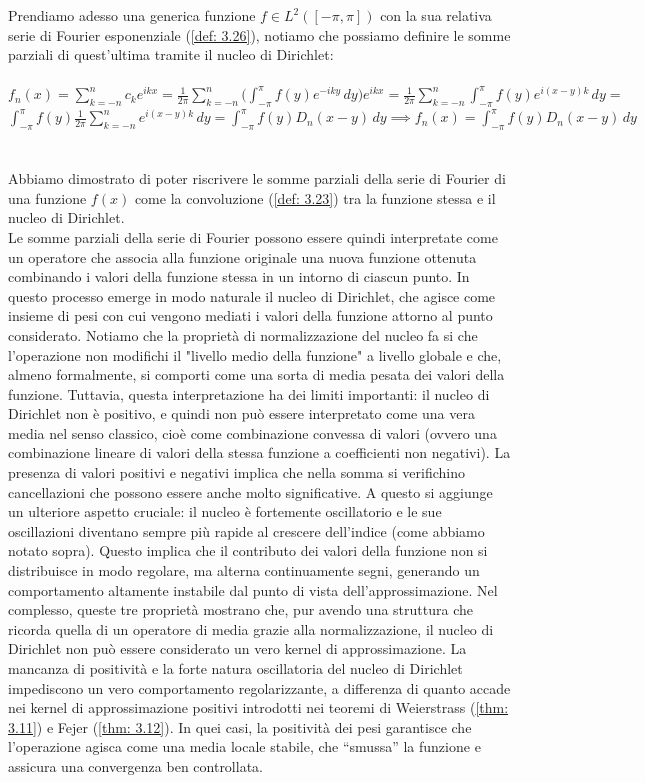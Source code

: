 \documentclass[a4paper,12pt]{report}
\begin{document}
Prendiamo adesso una generica funzione $f\in L^2([-\pi, \pi])$ con la sua relativa serie di Fourier esponenziale (\ref{def: 3.26}), notiamo che possiamo definire le somme parziali di quest'ultima tramite il nucleo di Dirichlet:
\\
\\ $f_n(x)=\displaystyle\sum_{k=-n}^nc_ke^{ikx}=\frac{1}{2\pi}\sum_{k=-n}^n\bigg(\int_{-\pi}^\pi f(y)e^{-iky}\,dy\bigg)e^{ikx}=\frac{1}{2\pi}\sum_{k=-n}^n\int_{-\pi}^\pi f(y)e^{i(x-y)k} \,dy=$
\\$\displaystyle\int_{-\pi}^\pi f(y)\frac{1}{2\pi}\sum_{k=-n}^ne^{i(x-y)k}\,dy=\int_{-\pi}^\pi f(y) D_n(x-y) \,dy \implies f_n(x)=\int_{-\pi}^\pi f(y) D_n(x-y)\,dy$
\\
\\
\\Abbiamo dimostrato di poter riscrivere le somme parziali della serie di Fourier di una funzione $f(x)$ come la convoluzione (\ref{def: 3.23}) tra la funzione stessa e il nucleo di Dirichlet. 
\\ Le somme parziali della serie di Fourier possono essere quindi interpretate come un operatore che associa alla funzione originale una nuova funzione ottenuta combinando i valori della funzione stessa in un intorno di ciascun punto. In questo processo emerge in modo naturale il nucleo di Dirichlet, che agisce come insieme di pesi con cui vengono mediati i valori della funzione attorno al punto considerato. Notiamo che la proprietà di normalizzazione del nucleo fa si che l’operazione non modifichi il "livello medio della funzione" a livello globale e che, almeno formalmente, si comporti come una sorta di media pesata dei valori della funzione. Tuttavia, questa interpretazione ha dei limiti importanti: il nucleo di Dirichlet non è positivo, e quindi non può essere interpretato come una vera media nel senso classico, cioè come combinazione convessa di valori (ovvero una combinazione lineare di valori della stessa funzione a coefficienti non negativi). La presenza di valori positivi e negativi implica che nella somma si verifichino cancellazioni che possono essere anche molto significative.
A questo si aggiunge un ulteriore aspetto cruciale: il nucleo è fortemente oscillatorio e le sue oscillazioni diventano sempre più rapide al crescere dell’indice (come abbiamo notato sopra). Questo implica che il contributo dei valori della funzione non si distribuisce in modo regolare, ma alterna continuamente segni, generando un comportamento altamente instabile dal punto di vista dell’approssimazione. Nel complesso, queste tre proprietà mostrano che, pur avendo una struttura che ricorda quella di un operatore di media grazie alla normalizzazione, il nucleo di Dirichlet non può essere considerato un vero kernel di approssimazione. La mancanza di positività e la forte natura oscillatoria del nucleo di Dirichlet impediscono un vero comportamento regolarizzante, a differenza di quanto accade nei kernel di approssimazione positivi introdotti nei teoremi di Weierstrass (\ref{thm: 3.11}) e Fejer (\ref{thm: 3.12}). In quei casi, la positività dei pesi garantisce che l’operazione agisca come una media locale stabile, che “smussa” la funzione e assicura una convergenza ben controllata.
\end{document}
